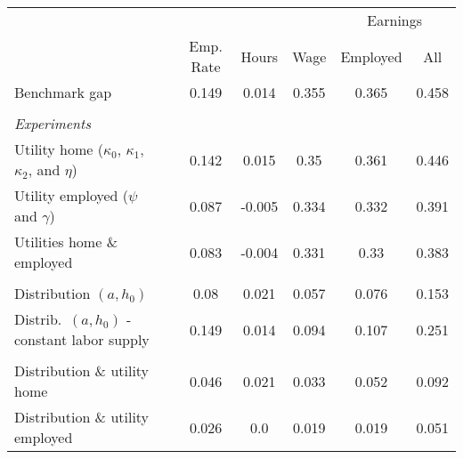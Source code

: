 \documentclass[a4paper,12pt]{article}
\newcommand{\rowgroup}[1]{\hspace{-1em}#1}
\begin{document}
 
\date{} 
\thispagestyle{empty} 
 
\begin{table}[H] 
\centering 
\begin{tabular}{llccccc} 
\hline 
\hline 
& & & & & \multicolumn{2}{c}{Earnings} \\ 
\cline{6-7} 
& & Emp. Rate &  Hours & Wage & Employed & All \\ 
\hline 
Benchmark gap & & 0.149 & 0.014 & 0.355 & 0.365 & 0.458 \\ 
\vspace{-0.2cm} \\ 
\rowgroup{\textit{Experiments}} \\ 
Utility home ($\kappa_0$, $\kappa_1$, $\kappa_2$, and $\eta$) & & 0.142 & 0.015 & 0.35 & 0.361 & 0.446 \\ 
Utility employed ($\psi$ and $\gamma$) & & 0.087 & -0.005 & 0.334 & 0.332 & 0.391 \\ 
Utilities home \& employed & & 0.083 & -0.004 & 0.331 & 0.33 & 0.383 \\ 
\vspace{-0.2cm} \\ 
Distribution $(a,h_0)$ & & 0.08 & 0.021 & 0.057 & 0.076 & 0.153 \\ 
Distrib.\ $(a,h_0)$ - constant labor supply & & 0.149 & 0.014 & 0.094 & 0.107 & 0.251 \\ 
\vspace{-0.2cm} \\ 
Distribution \& utility home & & 0.046 & 0.021 & 0.033 & 0.052 & 0.092 \\ 
Distribution \& utility employed & & 0.026 & 0.0 & 0.019 & 0.019 & 0.051 \\ 
\hline 
\hline 
\end{tabular} 
\end{table} 
\end{document}
